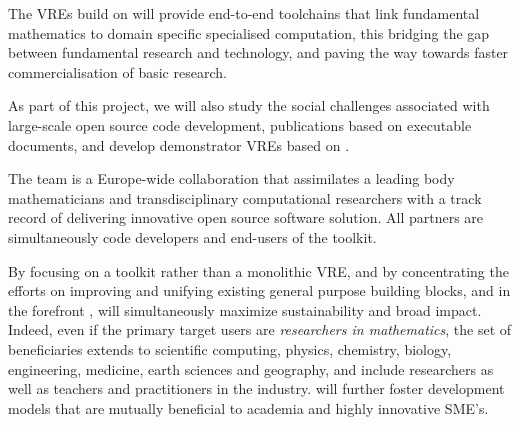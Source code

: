 The VREs build on \TheProject will provide end-to-end toolchains that
link fundamental mathematics to domain specific specialised
computation, this bridging the gap between fundamental research and
technology, and paving the way towards faster commercialisation of
basic research.

As part of this project, we will also study the social challenges
associated with large-scale open source code development, publications based on executable documents, and develop
demonstrator VREs based on \TheProject.

The \TheProject team is a Europe-wide collaboration that assimilates a
leading body mathematicians and transdisciplinary computational
researchers with a track record of delivering innovative open source
software solution. All partners are simultaneously code developers and end-users of the
toolkit.

By focusing on a toolkit rather than a monolithic VRE, and by
concentrating the efforts on improving and unifying existing general
purpose building blocks, and in the forefront \Jupyter, \TheProject
will simultaneously maximize sustainability and broad impact. Indeed,
even if the primary target users are \emph{researchers in
  mathematics}, the set of beneficiaries extends to scientific
computing, physics, chemistry, biology, engineering, medicine, earth
sciences and geography, and include researchers as well as teachers
and practitioners in the industry. \TheProject will further foster
development models that are mutually beneficial to academia and highly
innovative SME's.






\clearpage


